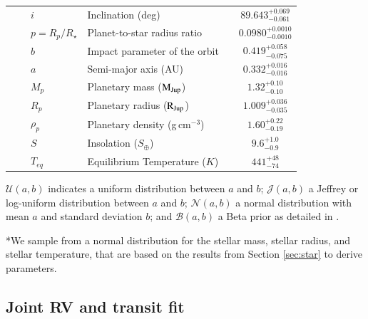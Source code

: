 \documentclass{aa}
\newcommand{\mjup}{\mbox{$\mathrm{M_{\rm Jup}}$}\xspace}
\newcommand{\rjup}{\mbox{$\mathrm{R_{\rm Jup}}$}\xspace}
\begin{document}
\begin{table}
\begin{minipage}{16cm}
\begin{tabular}{lllc}
~~~~$i$\dotfill & Inclination (deg) \dotfill & \dotfill & $89.643^{+0.069}_{-0.061}$ \\
~~~~$p=R_p/R_{\star}$\dotfill & Planet-to-star radius ratio \dotfill & \dotfill & $0.0980^{+0.0010}_{-0.0010}$ \\
~~~~$b$\dotfill &Impact parameter of the orbit \dotfill & \dotfill & $0.419^{+0.058}_{-0.075}$ \\
~~~~$a$\dotfill & Semi-major axis (AU)  \dotfill & \dotfill & $0.332^{+0.016}_{-0.016}$ \\
~~~~$M_p$\dotfill & Planetary mass (\mjup)  \dotfill & \dotfill & $1.32^{+0.10}_{-0.10}$ \\
~~~~$R_p$\dotfill & Planetary radius (\rjup)  \dotfill & \dotfill & $1.009^{+0.036}_{-0.035}$ \\
~~~~$\rho _p$\dotfill & Planetary density (g\,cm$^{-3}$)  \dotfill & \dotfill & $1.60^{+0.22}_{-0.19}$ \\
~~~~$S$\dotfill & Insolation ($S_{\oplus}$)  \dotfill & \dotfill & $9.6^{+1.0}_{-0.9}$ \\
~~~~$T_{eq}$\dotfill & Equilibrium Temperature ($K$) \dotfill & \dotfill & $441^{+48}_{-74}$ \\

\hline
\end{tabular}
\label{tab:planet}
{\raggedright*$\mathcal{U}(a,b)$ indicates a uniform distribution between $a$ and $b$; $\mathcal{J}(a,b)$ a Jeffrey or log-uniform distribution between $a$ and $b$; $\mathcal{N}(a,b)$ a normal distribution with mean $a$ and standard deviation $b$; and $\mathcal{B}(a,b)$ a Beta prior as detailed in \citet{Kipping2014}. \\ 
\raggedright**We sample from a normal distribution for the stellar mass, stellar radius, and stellar temperature, that are based on the results from Section \ref{sec:star} to derive parameters. \\
}
\end{minipage}
\end{table}

\subsection{Joint RV and transit fit} \label{sec:planetanalysis}
\end{document}
